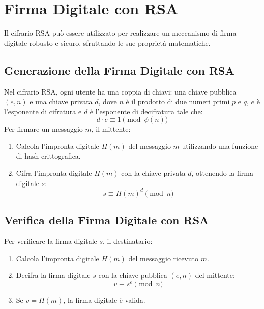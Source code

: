 \documentclass[a4paper,12pt]{report}
\begin{document}
\section{Firma Digitale con RSA}
Il cifrario RSA può essere utilizzato per realizzare un meccanismo di firma digitale robusto e sicuro, sfruttando le sue proprietà matematiche.

\subsection{Generazione della Firma Digitale con RSA}
Nel cifrario RSA, ogni utente ha una coppia di chiavi: una chiave pubblica $(e, n)$ e una chiave privata $d$, dove $n$ è il prodotto di due numeri primi $p$ e $q$, $e$ è l'esponente di cifratura e $d$ è l'esponente di decifratura tale che:
\[d \cdot e \equiv 1 \pmod{\phi(n)}\]
Per firmare un messaggio $m$, il mittente:

\begin{enumerate}
    \item Calcola l'impronta digitale $H(m)$ del messaggio $m$ utilizzando una funzione di hash crittografica.
    \item Cifra l'impronta digitale $H(m)$ con la chiave privata $d$, ottenendo la firma digitale $s$:
    \[ s \equiv H(m)^d \pmod{n}\]
\end{enumerate}

\subsection{Verifica della Firma Digitale con RSA}
Per verificare la firma digitale $s$, il destinatario:

\begin{enumerate}
    \item Calcola l'impronta digitale $H(m)$ del messaggio ricevuto $m$.
    \item Decifra la firma digitale $s$ con la chiave pubblica $(e, n)$ del mittente:
    \[v \equiv s^e \pmod{n}\]
    \item Se $v = H(m)$, la firma digitale è valida.
\end{enumerate}
\end{document}
